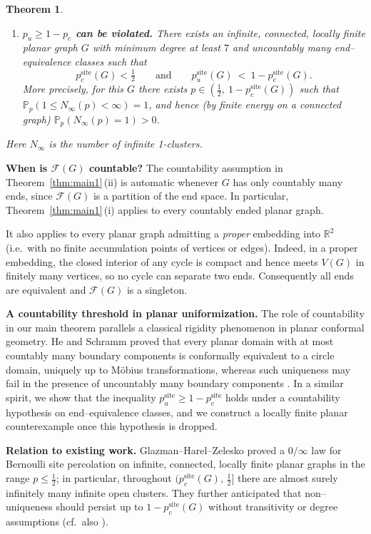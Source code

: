\documentclass[11pt]{amsart}
\theoremstyle{plain}
\newtheorem{theorem}{Theorem}[section]
\numberwithin{equation}{section}
\numberwithin{figure}{section}
\begin{document}
\begin{theorem}
\begin{enumerate}[label=\textup{(\roman*)}]
\begin{enumerate}
\item \textbf{$p_u\ge 1-p_c$ can be violated.}
There exists an infinite, connected, locally finite planar graph $G$ with minimum degree at least $7$
and uncountably many end--equivalence classes such that
\[
p_c^{\mathrm{site}}(G)<\tfrac12
\qquad\text{and}\qquad
p_u^{\mathrm{site}}(G)\ <\ 1-p_c^{\mathrm{site}}(G).
\]
More precisely, for this $G$ there exists $p\in(\tfrac12,\ 1-p_c^{\mathrm{site}}(G))$ such that
$\mathbb P_p(1\le N_\infty(p)<\infty)=1$, and hence (by finite energy on a connected graph)
$\mathbb P_p(N_\infty(p)=1)>0$.
\end{enumerate}
Here $N_{\infty}$ is the number of infinite 1-clusters.
\end{enumerate}

\end{theorem}




\noindent\textbf{When is $\mathcal F(G)$ countable?}
The countability assumption in Theorem~\ref{thm:main1}\,(ii) is automatic whenever $G$ has only
countably many ends, since $\mathcal F(G)$ is a partition of the end space.
In particular, Theorem~\ref{thm:main1}\,(i) applies to every countably ended planar graph.

It also applies to every planar graph admitting a \emph{proper} embedding into $\mathbb R^2$
(i.e.\ with no finite accumulation points of vertices or edges). Indeed, in a proper embedding,
the closed interior of any cycle is compact and hence meets $V(G)$ in finitely many vertices,
so no cycle can separate two ends. Consequently all ends are equivalent and $\mathcal F(G)$ is a singleton.

\medskip
\noindent\textbf{A countability threshold in planar uniformization.}
The role of countability in our main theorem parallels a classical rigidity phenomenon
in planar conformal geometry.
He and Schramm proved that every planar domain with at most countably many boundary
components is conformally equivalent to a circle domain, uniquely up to M\"obius transformations,
whereas such uniqueness may fail in the presence of uncountably many boundary components
\cite{HeSchramm93}.
In a similar spirit, we show that the inequality $p_u^{\mathrm{site}}\ge 1-p_c^{\mathrm{site}}$
holds under a countability hypothesis on end--equivalence classes, and we construct a
locally finite planar counterexample once this hypothesis is dropped.


\medskip

\noindent\textbf{Relation to existing work.}
Glazman--Harel--Zelesko \cite{GHZ25} proved a $0/\infty$ law for Bernoulli site percolation on
infinite, connected, locally finite planar graphs in the range $p\le \tfrac12$; in particular,
throughout $(p_c^{\mathrm{site}}(G),\,\tfrac12]$ there are almost surely infinitely many infinite open clusters.
They further anticipated that non--uniqueness should persist up to $1-p_c^{\mathrm{site}}(G)$
without transitivity or degree assumptions (cf.\ also \cite[Page 3]{GHZ25}).
\end{document}
